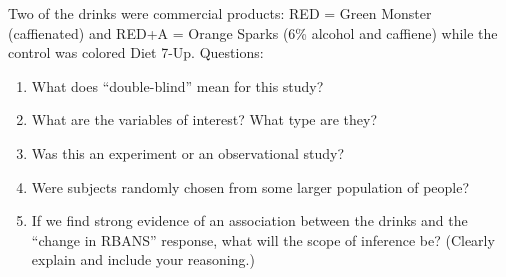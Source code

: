 Two of the drinks were commercial products: RED = Green Monster
(caffienated) and RED+A = Orange Sparks (6\% alcohol and caffiene)
while the control was colored Diet 7-Up.
\newpage
Questions:
\begin{enumerate}
\item What does ``double-blind'' mean for this study? \vfill
\item What are the variables of interest? What type are they?\vfill
\item Was this an experiment or an observational study?\vfill
\item Were subjects randomly chosen from some larger population of
  people?\vfill
\item If we find strong evidence of an association between the drinks
  and the ``change in RBANS'' response, what will the scope of
  inference be?  (Clearly explain and include your reasoning.)
\end{enumerate}
\normalsize